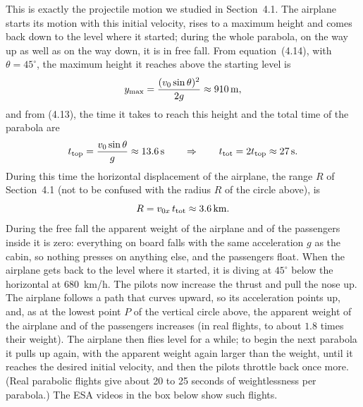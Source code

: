 \documentclass[11pt,a4paper]{article}
\begin{document}
This is exactly the projectile motion we studied in Section~4.1. The airplane starts its motion with
this initial velocity, rises to a maximum height and comes back down to the level where it started;
during the whole parabola, on the way up as well as on the way down, it is in free fall. From
equation~(4.14), with $\theta = 45^\circ$, the maximum height it reaches above the starting level is
\begin{equation}\label{eq:zg-ymax}
  y_{\mathrm{max}} = \frac{(v_0 \sin\theta)^2}{2g} \approx \qty{910}{m} ,
\end{equation}
and from (4.13), the time it takes to reach this height and the total time of the parabola are
\begin{equation}\label{eq:zg-t}
  t_{\mathrm{top}} = \frac{v_0 \sin\theta}{g} \approx \qty{13.6}{s} \qquad \Rightarrow \qquad
  t_{\mathrm{tot}} = 2t_{\mathrm{top}} \approx \qty{27}{s} .
\end{equation}
During this time the horizontal displacement of the airplane, the range $R$ of Section~4.1 (not to be
confused with the radius $R$ of the circle above), is
\begin{equation}\label{eq:zg-R}
  R = v_{0x}\, t_{\mathrm{tot}} \approx \qty{3.6}{km} .
\end{equation}
During the free fall the apparent weight of the airplane and of the passengers inside it is zero:
everything on board falls with the same acceleration $g$ as the cabin, so nothing presses on
anything else, and the passengers float. When the airplane gets back to the level where it started,
it is diving at $45^\circ$ below the horizontal at \qty{680}{km/h}. The pilots now increase the
thrust and pull the nose up. The airplane follows a path that curves upward, so its acceleration
points up, and, as at the lowest point $P$ of the vertical circle above, the apparent weight of the
airplane and of the passengers increases (in real flights, to about $1.8$ times their weight). The
airplane then flies level for a while; to begin the next parabola it pulls up again, with the
apparent weight again larger than the weight, until it reaches the desired initial velocity, and
then the pilots throttle back once more. (Real parabolic flights give about 20 to 25 seconds of
weightlessness per parabola.) The ESA videos in the box below show such flights.
\end{document}
